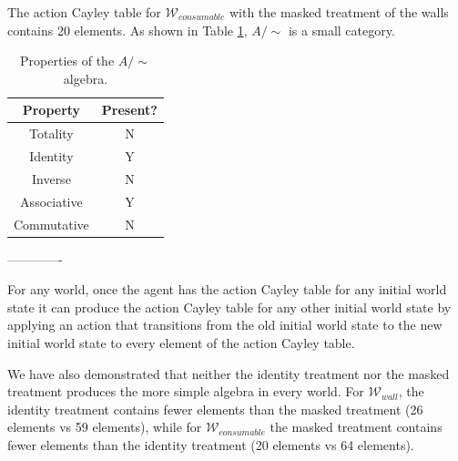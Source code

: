 The action Cayley table for $\mathscr{W}_{consumable}$ with the masked treatment of the walls contains 20 elements.
As shown in Table \ref{tab:masked-consumable-properties}, $A/\sim$ is a small category.

\begin{table}[H]
    \centering
    \begin{tabular}{c|c}
        \textbf{Property}   & \textbf{Present?} \\
        \hline
        Totality            & N\\
        Identity            & Y\\
        Inverse             & N\\
        Associative         & Y\\
        Commutative         & N
    \end{tabular}
    \caption{Properties of the $A/\sim$ algebra.}
    \label{tab:masked-consumable-properties}
\end{table}








-------------

\begin{remark}
    For any world, once the agent has the action Cayley table for any initial world state it can produce the action Cayley table for any other initial world state by applying an action that transitions from the old initial world state to the new initial world state to every element of the action Cayley table.
\end{remark}

We have also demonstrated that neither the identity treatment nor the masked treatment produces the more simple algebra in every world.
For $\mathscr{W}_{wall}$, the identity treatment contains fewer elements than the masked treatment (26 elements vs 59 elements), while for $\mathscr{W}_{consumable}$ the masked treatment contains fewer elements than the identity treatment (20 elements vs 64 elements).


